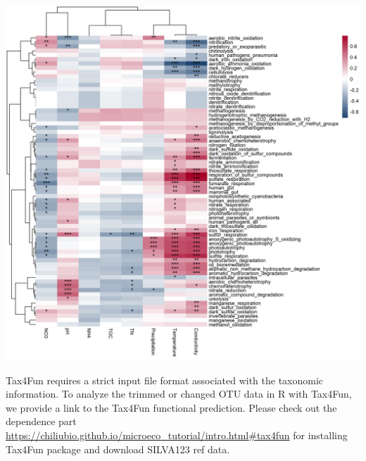\documentclass[
]{book}
\newenvironment{Shaded}{\begin{snugshade}}{\end{snugshade}}
\newcommand{\AttributeTok}[1]{\textcolor[rgb]{0.77,0.63,0.00}{#1}}
\newcommand{\CommentTok}[1]{\textcolor[rgb]{0.56,0.35,0.01}{\textit{#1}}}
\newcommand{\FunctionTok}[1]{\textcolor[rgb]{0.00,0.00,0.00}{#1}}
\newcommand{\NormalTok}[1]{#1}
\newcommand{\OtherTok}[1]{\textcolor[rgb]{0.56,0.35,0.01}{#1}}
\newcommand{\SpecialCharTok}[1]{\textcolor[rgb]{0.00,0.00,0.00}{#1}}
\newcommand{\StringTok}[1]{\textcolor[rgb]{0.31,0.60,0.02}{#1}}
\begin{document}
\begin{center}\includegraphics[width=800px]{Images/plot_func_perc_corr} \end{center}

Tax4Fun \citep{Aßhauer_Tax4Fun_2015} requires a strict input file format associated with the taxonomic information.
To analyze the trimmed or changed OTU data in R with Tax4Fun, we provide a link to the Tax4Fun functional prediction.
Please check out the dependence part \url{https://chiliubio.github.io/microeco_tutorial/intro.html\#tax4fun} for installing Tax4Fun package and download SILVA123 ref data.

\begin{Shaded}
\end{Shaded}
\end{document}
